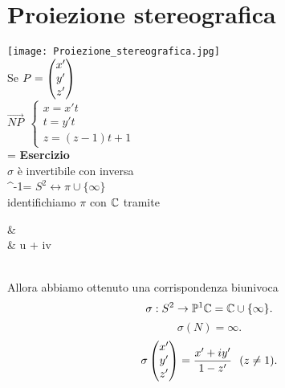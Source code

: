 \documentclass[12px]{article}
\begin{document}
	\section{Proiezione stereografica}
	\texttt{[image: Proiezione\_stereografica.jpg]}\\
	Se $P = \begin{pmatrix}x'\\y'\\z'\end{pmatrix}$\\
	 $\overrightarrow{NP}\ \ \begin{cases}
	 	x = x't\\
		t = y't\\
		z = (z-1)t + 1
	 \end{cases}$\\
	 \sigma {} = 
	 \textbf{Esercizio}\\
	 $\sigma$ è invertibile con inversa\\
	 \sigma^-1=
	 $S^2 \leftrightarrow \pi\cup \{\infty\}$\\
	 identifichiamo  $\pi$ con $\mathbb{C}$ tramite\\
	 \begin{aligend}
		&\pi \ \ \ \ \rightarrow\ \ \ \ \ \C\\
		& \rightarrow u + iv
	 \end{aligend}\\
	 Allora abbiamo ottenuto una corrispondenza biunivoca 
	 \[
		 \sigma : S^2 \rightarrow \mathbb{P}^1{\mathbb{C}} = \mathbb{C}\cup\{\infty\}
	 .\] 
	 \[
	 \sigma(N) =\infty
	 .\] 
	 \[
	 \sigma\begin{pmatrix}x'\\y'\\z'\end{pmatrix} = \frac{x'+iy' }{1-z'} \ \ (z\neq 1)
	 .\] 
	 \newpage
\end{document}
